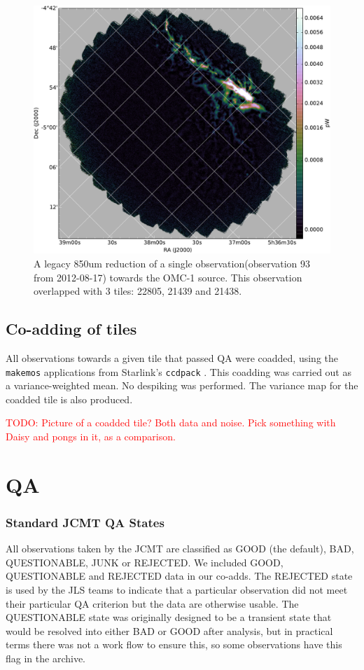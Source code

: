 \documentclass[usenatbib]{mnras}
\newcommand{\todo}[1]{\textcolor{red}{TODO: #1}}
\newcommand{\ascl}[1]{\href{http://www.ascl.net/#1}{ascl:#1}}
\newcommand{\status}[1]{\textsf{#1}}
\begin{document}
\begin{figure}
  \centering
  \includegraphics[width=0.6\linewidth]{omc1_example_legacy}
  \caption{A legacy 850um reduction of a single
    observation(observation 93 from 2012-08-17) towards the OMC-1
    source. This observation overlapped with 3 tiles: 22805, 21439 and
    21438. }
  \label{fig:omc1-example}
    \end{figure}


\subsection{Co-adding of tiles}
All observations towards a given tile that passed QA were coadded,
using the \texttt{makemos} applications from Starlink's
\texttt{ccdpack} \citep[][\ascl{1403.021}]{SUN139}. This coadding was
carried out as a variance-weighted mean. No despiking was
performed. The variance map for the coadded tile is also produced.

\todo{Picture of a coadded tile? Both data and noise. Pick something with Daisy and pongs in it, as a comparison.}




\section{QA}
\label{sec:QA}
\subsubsection{Standard JCMT QA States}
All observations taken by the JCMT are classified as \status{GOOD}
(the default), \status{BAD}, \status{QUESTIONABLE}, \status{JUNK} or
\status{REJECTED}. We included \status{GOOD}, \status{QUESTIONABLE}
and \status{REJECTED} data in our co-adds. The \status{REJECTED} state
is used by the JLS teams to indicate that a particular observation did
not meet their particular QA criterion but the data are otherwise
usable. The \status{QUESTIONABLE} state was originally designed to be
a transient state that would be resolved into either \status{BAD} or
\status{GOOD} after analysis, but in practical terms there was not a
work flow to ensure this, so some observations have this flag in the
archive.
\end{document}

